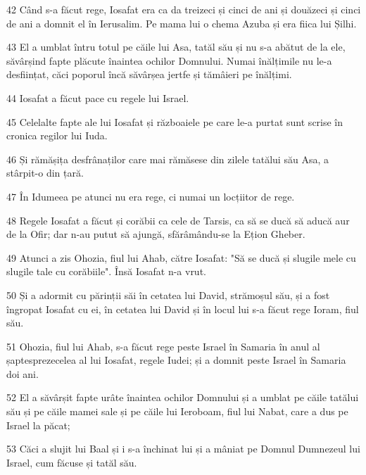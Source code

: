 \par 42 Când s-a făcut rege, Iosafat era ca da treizeci și cinci de ani și douăzeci și cinci de ani a domnit el în Ierusalim. Pe mama lui o chema Azuba și era fiica lui Șilhi.
\par 43 El a umblat întru totul pe căile lui Asa, tatăl său și nu s-a abătut de la ele, săvârșind fapte plăcute înaintea ochilor Domnului. Numai înălțimile nu le-a desființat, căci poporul încă săvârșea jertfe și tămâieri pe înălțimi.
\par 44 Iosafat a făcut pace cu regele lui Israel.
\par 45 Celelalte fapte ale lui Iosafat și războaiele pe care le-a purtat sunt scrise în cronica regilor lui Iuda.
\par 46 Și rămășița desfrânaților care mai rămăsese din zilele tatălui său Asa, a stârpit-o din țară.
\par 47 În Idumeea pe atunci nu era rege, ci numai un locțiitor de rege.
\par 48 Regele Iosafat a făcut și corăbii ca cele de Tarsis, ca să se ducă să aducă aur de la Ofir; dar n-au putut să ajungă, sfărâmându-se la Ețion Gheber.
\par 49 Atunci a zis Ohozia, fiul lui Ahab, către Iosafat: "Să se ducă și slugile mele cu slugile tale cu corăbiile". Însă Iosafat n-a vrut.
\par 50 Și a adormit cu părinții săi în cetatea lui David, strămoșul său, și a fost îngropat Iosafat cu ei, în cetatea lui David și în locul lui s-a făcut rege Ioram, fiul său.
\par 51 Ohozia, fiul lui Ahab, s-a făcut rege peste Israel în Samaria în anul al șaptesprezecelea al lui Iosafat, regele Iudei; și a domnit peste Israel în Samaria doi ani.
\par 52 El a săvârșit fapte urâte înaintea ochilor Domnului și a umblat pe căile tatălui său și pe căile mamei sale și pe căile lui Ieroboam, fiul lui Nabat, care a dus pe Israel la păcat;
\par 53 Căci a slujit lui Baal și i s-a închinat lui și a mâniat pe Domnul Dumnezeul lui Israel, cum făcuse și tatăl său.


